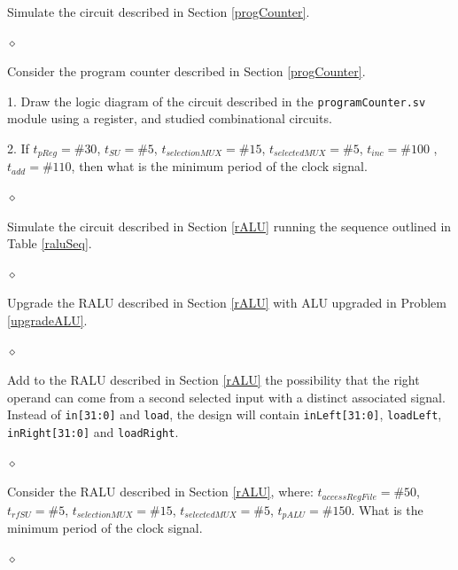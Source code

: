 \begin{problem}
Simulate the circuit described in Section \ref{progCounter}.

$\diamond$
\end{problem}

\begin{problem}
Consider the program counter described in Section \ref{progCounter}.

1. Draw the logic diagram of the circuit described in the {\tt programCounter.sv} module using a register, and studied combinational circuits.

2. If $t_{pReg} = \#30$, $t_{SU} = \#5$, $t_{selectionMUX} = \#15$, $t_{selectedMUX} = \#5$, $t_{inc} = \#100$ , $t_{add} = \#110$, then what is the minimum period of the clock signal.

$\diamond$
\end{problem}

\begin{problem}
Simulate the circuit described in Section \ref{rALU} running the sequence outlined in Table \ref{raluSeq}.

$\diamond$
\end{problem}

\begin{problem}
Upgrade the RALU described in Section \ref{rALU} with ALU upgraded in Problem \ref{upgradeALU}.

$\diamond$
\end{problem}


\begin{problem}
Add to the RALU described in Section \ref{rALU} the possibility that the right operand can come from a second selected input with a distinct associated signal. Instead of {\tt in[31:0]} and {\tt load}, the design will contain {\tt inLeft[31:0]}, {\tt loadLeft}, {\tt inRight[31:0]} and {\tt loadRight}.

$\diamond$
\end{problem}


\begin{problem}
Consider the RALU described in Section \ref{rALU}, where: $t_{accessRegFile} = \#50$, $t_{rfSU} = \#5$, $t_{selectionMUX} = \#15$, $t_{selectedMUX} = \#5$, $t_{pALU} = \#150$. What is the minimum period of the clock signal.

$\diamond$
\end{problem}


